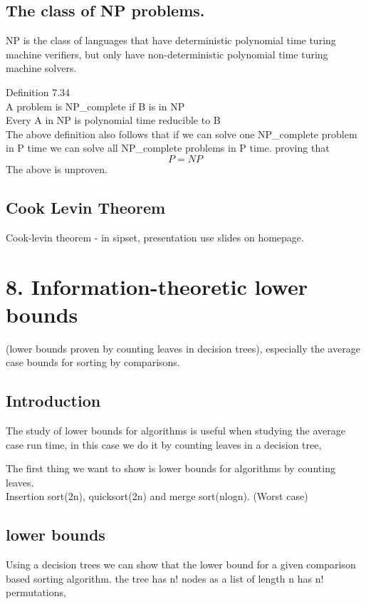 \documentclass[a4paper,10pt,titlepage]{report}
\begin{document}
\subsection{The class of NP problems.}
NP is the class of languages that have deterministic polynomial time turing machine verifiers, but only have non-deterministic polynomial time turing machine solvers.

Definition 7.34\\
A problem is NP\_complete if B is in NP\\
Every A in NP is polynomial time reducible to B\\

The above definition also follows that if we can solve one NP\_complete problem in P time we can solve all NP\_complete problems in P time. proving that\\
\begin{equation}
P = NP
\end{equation}
The above is unproven. \\

\subsection{Cook Levin Theorem}

Cook-levin theorem - in sipset, presentation use slides on homepage.


\newpage
\section{8. Information-theoretic lower bounds}

(lower bounds proven by counting leaves in decision trees), especially the average case bounds for sorting
by comparisons.

\subsection{Introduction}

The study of lower bounds for algorithms is useful when studying the average case run time, in this case we do it by counting leaves in a decision tree,

The first thing we want to show is lower bounds for algorithms by counting leaves.\\

Insertion sort(2n), quicksort(2n) and merge sort(nlogn). (Worst case)\\
\subsection{lower bounds}
Using a decision trees we can show that the lower bound for a given comparison based sorting algorithm. the tree has n! nodes as a list of length n has n! permutations,
\end{document}
